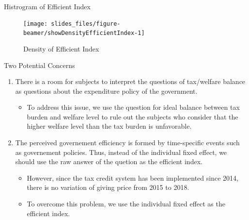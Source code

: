 \documentclass[
  ignorenonframetext,
]{beamer}
\providecommand{\tightlist}{%
  \setlength{\itemsep}{0pt}\setlength{\parskip}{0pt}}
\begin{document}
\begin{frame}{Histrogram of Efficient Index}
\protect\hypertarget{histrogram-of-efficient-index}{}
\begin{figure}[t]

{\centering \texttt{[image: slides\_files/figure-beamer/showDensityEfficientIndex-1]} 

}

\caption{Density of Efficient Index}\label{fig:showDensityEfficientIndex}
\end{figure}
\end{frame}

\begin{frame}{Two Potential Concerns}
\protect\hypertarget{two-potential-concerns}{}
\begin{enumerate}
\tightlist
\item
  There is a room for subjects to interpret the questions of tax/welfare balance as questions about the expenditure policy of the government.

  \begin{itemize}
  \tightlist
  \item
    To address this issue, we use the question for ideal balance between tax burden and welfare level to rule out the subjects who consider that the higher welfare level than the tax burden is unfavorable.
  \end{itemize}
\item
  The perceived governement efficiency is formed by time-specific events such as governement policies. Thus, instead of the individual fixed effect, we should use the raw answer of the quetion as the efficient index.

  \begin{itemize}
  \tightlist
  \item
    However, since the tax credit system has been implemented since 2014, there is no variation of giving price from 2015 to 2018.
  \item
    To overcome this problem, we use the individual fixed effect as the efficient index.
  \end{itemize}
\end{enumerate}
\end{frame}
\end{document}
